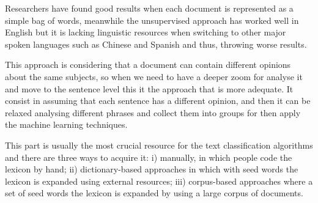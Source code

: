 Researchers have found good results when each document is represented as a simple bag of words, meanwhile the unsupervised approach has worked well in English but it is lacking linguistic resources when switching to other major spoken languages such as Chinese and Spanish and thus, throwing worse results.

This approach is considering that a document can contain different opinions about the same subjects, so when we need to have a deeper zoom for analyse it and move to the sentence level this it the approach that is more adequate. It consist in assuming that each sentence has a different opinion, and then it can be relaxed analysing different phrases and collect them into groups for then apply the machine learning techniques.




This part is usually the most crucial resource for the text classification algorithms and there are three ways to acquire it: i) manually, in which people code the lexicon by hand; ii) dictionary-based approaches in which with seed words the lexicon is expanded using external resources; iii) corpus-based approaches where a set of seed words the lexicon is expanded by using a large corpus of documents.\\

